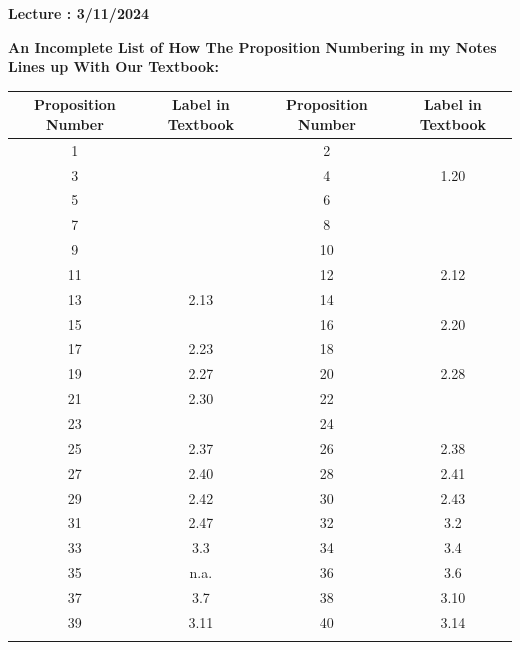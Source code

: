 \documentclass{book}
\newenvironment{allowTableDashes}{\ADLactivate}{\ADLinactivate}
\newcommand{\exOne}{%
   \color{Purple}%
   \fontsize{14}{16}\selectfont%
}
\newcommand{\retTwo}{\hfill\bigbreak}
\newcounter{LectureNumber}
\newcommand*{\markLecture}[1]{%
   \stepcounter{LectureNumber}%
   {\huge \color{Black} \textbf{Lecture \theLectureNumber: #1} \newline}%
}
\newcommand{\myVS}{\vphantom{$\int_a^b$}}
\begin{document}
   \markLecture{3/11/2024}

   \newpage
   {\huge \color{Black} \textbf{An Incomplete List of How The Proposition Numbering in my Notes Lines up With Our Textbook:} \retTwo}
   \exOne
   
   \begin{allowTableDashes}
      \begin{tabular}{ c|c||c|c }
         Proposition Number & Label in Textbook & Proposition Number & Label in Textbook \\ \hline
         \myVS 1 &  & 2 &  \\ \hdashline[10pt/3pt]
         \myVS 3 &  & 4 & 1.20 \\ \hdashline[10pt/3pt]
         \myVS 5 &  & 6 &  \\ \hdashline[10pt/3pt]
         \myVS 7 &  & 8 &  \\ \hdashline[10pt/3pt]
         \myVS 9 &  & 10 &  \\ \hdashline[10pt/3pt]
         \myVS 11 &  & 12 & 2.12 \\ \hdashline[10pt/3pt]
         \myVS 13 & 2.13 & 14 &  \\ \hdashline[10pt/3pt]
         \myVS 15 &  & 16 & 2.20 \\ \hdashline[10pt/3pt]
         \myVS 17 & 2.23 & 18 &  \\ \hdashline[10pt/3pt]
         \myVS 19 & 2.27 & 20 & 2.28 \\ \hdashline[10pt/3pt]
         \myVS 21 & 2.30 & 22 &  \\ \hdashline[10pt/3pt]
         \myVS 23 &  & 24 &  \\ \hdashline[10pt/3pt]
         \myVS 25 & 2.37 & 26 & 2.38 \\ \hdashline[10pt/3pt]
         \myVS 27 & 2.40 & 28 & 2.41 \\ \hdashline[10pt/3pt]
         \myVS 29 & 2.42 & 30 & 2.43 \\ \hdashline[10pt/3pt]
         \myVS 31 & 2.47 & 32 & 3.2\phantom{0} \\ \hdashline[10pt/3pt]
         \myVS 33 & 3.3\phantom{0}  & 34 & 3.4\phantom{0} \\ \hdashline[10pt/3pt]
         \myVS 35 & n.a. & 36 & 3.6\phantom{0} \\ \hdashline[10pt/3pt]
         \myVS 37 & 3.7 & 38 & 3.10  \\ \hdashline[10pt/3pt]
         \myVS 39 & 3.11 & 40 & 3.14 \\ \hdashline[10pt/3pt]

\end{tabular}
\end{allowTableDashes}
\end{document}
